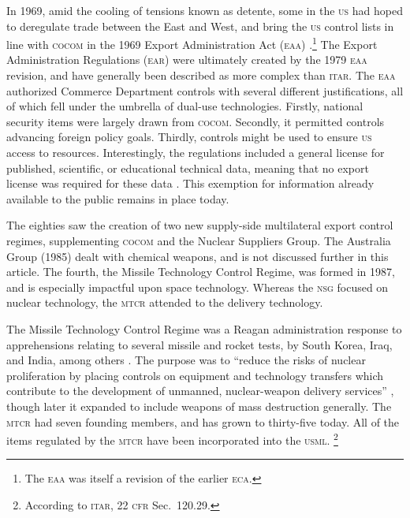\documentclass[preprint,twocolumn,5p]{elsarticle}
\begin{document}
In 1969, amid the cooling of tensions known as detente, some in the \textsc{us} had hoped to deregulate trade between the East and West, and bring the \textsc{us} control lists in line with \textsc{cocom} in the 1969 Export Administration Act (\textsc{eaa}) \citep{NAP1987}.\footnote{The \textsc{eaa} was itself a revision of the earlier \textsc{eca}.} The Export Administration Regulations (\textsc{ear}) were ultimately created by the 1979 \textsc{eaa} revision, and have generally been described as more complex than \textsc{itar}. The \textsc{eaa} authorized Commerce Department controls with several different justifications, all of which fell under the umbrella of dual-use technologies. Firstly, national security items were largely drawn from \textsc{cocom}. Secondly, it permitted controls advancing foreign policy goals. Thirdly, controls might be used to ensure \textsc{us} access to resources. Interestingly, the regulations included a general license for published, scientific, or educational technical data, meaning that no export license was required for these data \citep{NAP1987}. This exemption for information already available to the public remains in place today.

The eighties saw the creation of two new supply-side multilateral export control regimes, supplementing \textsc{cocom} and the Nuclear Suppliers Group. The Australia Group (1985) dealt with chemical weapons, and is not discussed further in this article. The fourth, the Missile Technology Control Regime, was formed in 1987, and is especially impactful upon space technology. Whereas the \textsc{nsg} focused on nuclear technology, the \textsc{mtcr} attended to the delivery technology.

The Missile Technology Control Regime was a Reagan administration response to apprehensions relating to several missile and rocket tests, by South Korea, Iraq, and India, among others \citep{Scheffran1992}. The purpose was to ``reduce the risks of nuclear proliferation by placing controls on equipment and technology transfers which contribute to the development of unmanned, nuclear-weapon delivery services'' \citep{Fialka1987}, though later it expanded to include weapons of mass destruction generally. The \textsc{mtcr} had seven founding members, and has grown to thirty-five today. All of the items regulated by the \textsc{mtcr} have been incorporated into the \textsc{usml}. \footnote{According to \textsc{itar}, 22 \textsc{cfr} Sec.~120.29.}
\end{document}

